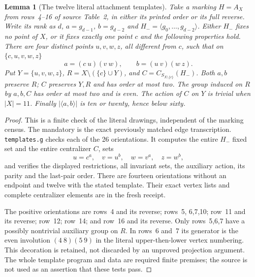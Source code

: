 \documentclass[11pt,a4paper]{article}
\newtheorem{lemma}{Lemma}
\newcommand{\gen}[1]{\langle#1\rangle}
\begin{document}
\begin{lemma}[The twelve literal attachment templates]\label{lem:templates}
Take a marking $H=A_X$ from rows~4--16 of source Table~2, in
either its printed order or its full reverse. Write its rank
as $d$, $a=g_{d-1}$, $b=g_{d-2}$ and
$H_-=\gen{g_0,\ldots,g_{d-2}}$. Either $H_-$ fixes no point
of $X$, or it fixes exactly one point $c$ and the following
properties hold. There are four distinct points $u,v,w,z$,
all different from $c$, such that on $\{c,u,v,w,z\}$
\[
                   a=(c\ u)(v\ w),\qquad b=(u\ v)(w\ z).
\]
Put $Y=\{u,v,w,z\}$, $R=X\setminus(\{c\}\cup Y)$, and
$C=C_{S_{X\setminus\{c\}}}(H_-)$. Both $a,b$ preserve $R$;
$C$ preserves $Y,R$ and has order at most two. The group induced
on $R$ by $a,b,C$ has order at most two and is even. The action
of $C$ on $Y$ is trivial when $|X|=11$. Finally
$|\gen{a,b}|$ is ten or twenty, hence below sixty.
\end{lemma}
\begin{proof}
This is a finite check of the literal drawings, independent of
the marking census. The mandatory 
is the exact previously matched edge transcription.
\texttt{templates.g} checks each of the 26 orientations. It
computes the entire $H_-$ fixed set and the entire centralizer
$C$, sets
\[
              u=c^a,\quad v=u^b,\quad w=v^a,\quad z=w^b,
\]
and verifies the displayed restrictions, all invariant sets,
the auxiliary action, its parity and the last-pair order.
There are fourteen orientations without an endpoint and twelve
with the stated template. Their exact vertex lists and complete
centralizer elements are in the fresh receipt.

The positive orientations are rows~4 and its reverse; rows~5,
6,7,10; row~11 and its reverse; row~12; row~14; and row~16 and
its reverse. Only rows~5,6,7 have a possibly nontrivial auxiliary
group on $R$. In rows~6 and~7 its generator is the even
involution $(4\ 8)(5\ 9)$ in the literal upper-then-lower vertex
numbering. This decoration is retained, not discarded by an
unproved projection argument. The whole template program and
data are required finite premises; the source is not used as
an assertion that these tests pass.
\end{proof}
\end{document}
